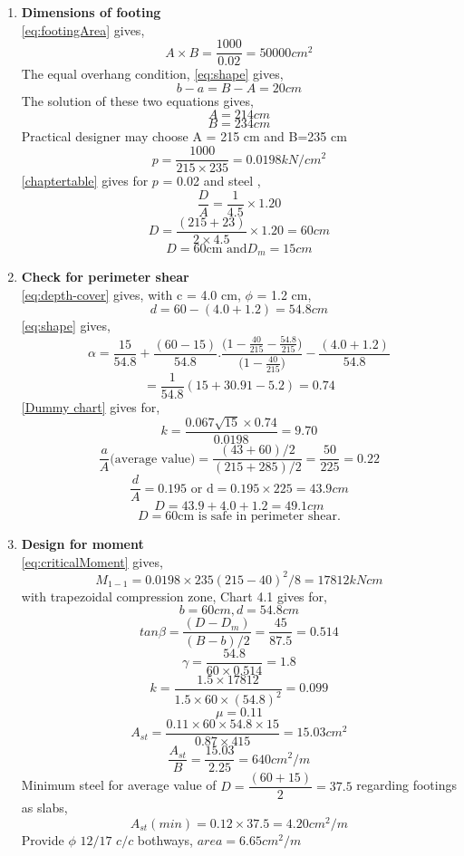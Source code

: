 \begin{enumerate}
\item   \textbf{Dimensions of footing}\\
  \equmacro \ref{eq:footingArea} gives,
  $$ A\times B= \frac{1000}{0.02}=50000 cm^2$$
  The equal overhang condition, \equmacro \ref{eq:shape} gives,
  $$ b-a=B-A=20 cm$$
  The solution of these two equations gives,
  $$A=214 cm$$
  $$B=234 cm$$
  Practical designer may choose A = 215 cm and B=235 cm
  $$p=\frac{1000}{215\times235}=0.0198  kN/cm^2$$
  \tablemacro \ref{chaptertable} gives for $p$ = 0.02 and steel \Fefouronefivemacro,
 $$\frac{D}{A}=\frac{1}{4.5}\times1.20$$
 $$D=\frac{(215+23)}{2 \times 4.5} \times 1.20=60cm$$
 $$D=60 \text{cm and} D_m=15cm$$
 
\item  \textbf{Check for perimeter shear}\\
 \equmacro \ref{eq:depth-cover} gives, with c = 4.0 cm, $\phi$ = 1.2 cm,
 $$d=60-(4.0+1.2)=54.8cm$$
 \equmacro \ref{eq:shape} gives,
 $$ \alpha=\frac{15}{54.8}+\frac{(60-15)}{54.8}.\frac{\Bigg(1-\frac{40}{215}-\frac{54.8}{215}\Bigg)}{\Bigg(1-\frac{40}{215}\Bigg)}-\frac{(4.0+1.2)}{54.8}$$
 $$=\frac{1}{54.8}(15+30.91-5.2)=0.74$$
 \chartmacro \ref{Dummy chart} gives for,
 $$ k=\frac{0.067\sqrt{15}\times0.74}{0.0198}=9.70$$
 $$\frac{a}{A} \text{(average value)}=\frac{(43+60)/2}{(215+285)/2}=\frac{50}{225}=0.22$$
 $$\frac{d}{A}=0.195 \text{ or d}=0.195\times225=43.9 cm$$
 $$D=43.9+4.0+1.2=49.1 cm$$
 $$D=60 \text{cm is safe in perimeter shear.}$$
 
\item  \textbf{Design for moment}\\
   \equmacro \ref{eq:criticalMoment} gives,
   $$M_{1-1}=0.0198 \times 235(215-40)^2/8=17812 kN cm$$
   with trapezoidal compression zone, Chart 4.1 gives for,
   $$b=60cm, d=54.8 cm$$
   $$tan\beta =\frac{(D-D_m)}{(B-b)/2}=\frac{45}{87.5}=0.514$$
   $$\gamma=\frac{54.8}{60\times0.514}=1.8$$
   $$k=\frac{1.5 \times 17812}{1.5 \times 60 \times (54.8)^2}=0.099$$
   $$\mu=0.11$$
   $$A_{st}=\frac{0.11 \times 60 \times 54.8 \times 15}{0.87 \times 415}=15.03cm^2$$
   $$\frac{A_{st}}{B}=\frac{15.03}{2.25}=640 cm^2/m$$
  Minimum steel for average value of $D =\dfrac{(60+15)}{2}=37.5$ regarding footings as slabs,
  $$A_{st}(min)=0.12\times 37.5=4.20 cm^2/m$$
  Provide $\phi$ $12/17$ $c/c$ bothways, $area=6.65 cm^2/m$
  

\end{enumerate}
